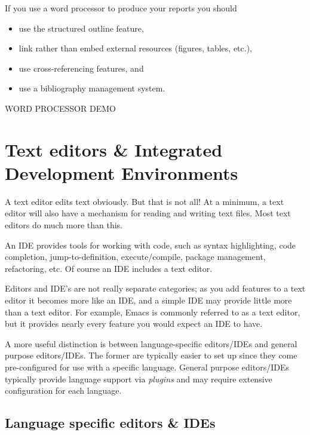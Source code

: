 \documentclass[]{book}
\providecommand{\tightlist}{%
  \setlength{\itemsep}{0pt}\setlength{\parskip}{0pt}}
\begin{document}
If you use a word processor to produce your reports you should

\begin{itemize}
\tightlist
\item
  use the structured outline feature,
\item
  link rather than embed external resources (figures, tables, etc.),
\item
  use cross-referencing features, and
\item
  use a bibliography management system.
\end{itemize}

WORD PROCESSOR DEMO

\hypertarget{text-editors-integrated-development-environments}{%
\section{Text editors \& Integrated Development Environments}\label{text-editors-integrated-development-environments}}

A text editor edits text obviously. But that is not all! At a minimum, a text editor will also have a mechanism for reading and writing text files. Most text editors do much more than this.

An IDE provides tools for working with code, such as syntax highlighting, code completion, jump-to-definition, execute/compile, package management, refactoring, etc. Of course an IDE includes a text editor.

Editors and IDE's are not really separate categories; as you add features to a text editor it becomes more like an IDE, and a simple IDE may provide little more than a text editor. For example, Emacs is commonly referred to as a text editor, but it provides nearly every feature you would expect an IDE to have.

A more useful distinction is between language-specific editors/IDEs and general purpose editors/IDEs. The former are typically easier to set up since they come pre-configured for use with a specific language. General purpose editors/IDEs typically provide language support via \emph{plugins} and may require extensive configuration for each language.

\hypertarget{language-specific-editors-ides}{%
\subsection{Language specific editors \& IDEs}\label{language-specific-editors-ides}}
\end{document}
